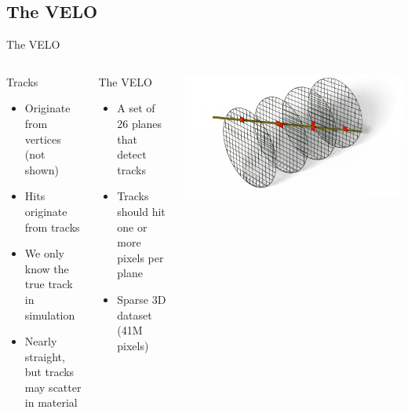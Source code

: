 \subsection{The VELO}
\begin{frame}{The VELO}
  \begin{columns}[c]
    \begin{block}{Tracks}
      \begin{itemize}
          \item Originate from vertices (not shown)
          \item Hits originate from tracks
          \item We only know the true track in simulation
          \item Nearly straight, but tracks may scatter in material
      \end{itemize}
    \end{block}
    \begin{block}{The VELO}
      \begin{itemize}
          \item A set of 26 planes that detect tracks
          \item Tracks should hit one or more pixels per plane
          \item Sparse 3D dataset (41M pixels)
      \end{itemize}
    \end{block}
    \centering
    \includegraphics[width=\textwidth, trim=200 0 100 0]{images/Intersections.png}
  \end{columns}
\end{frame}

